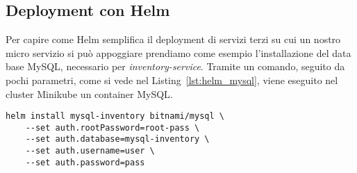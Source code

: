 \subsection{Deployment con Helm}
Per capire come Helm semplifica il deployment di servizi terzi su cui un nostro micro servizio si può appoggiare prendiamo come esempio l'installazione del data base MySQL, necessario per \textit{inventory-service}. Tramite un comando, seguito da pochi parametri, come si vede nel Listing~\ref{lst:helm_mysql}, viene eseguito nel cluster Minikube un container MySQL.
\begin{lstlisting}[caption=MySQL Helm chart, label=lst:helm_mysql]
helm install mysql-inventory bitnami/mysql \
    --set auth.rootPassword=root-pass \
    --set auth.database=mysql-inventory \
    --set auth.username=user \
    --set auth.password=pass
\end{lstlisting}